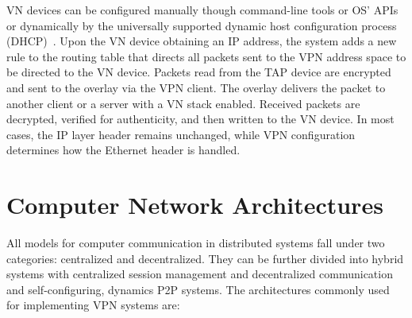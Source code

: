 VN devices can be configured manually though command-line tools or OS' APIs or
dynamically by the universally supported dynamic host configuration process
(DHCP)~\cite{dhcp0, dhcp1}.  Upon the VN device obtaining an IP address, the
system adds a new rule to the routing table that directs all packets sent to
the VPN address space to be directed to the VN device.  Packets read from the
TAP device are encrypted and sent to the overlay via the VPN client.  The
overlay delivers the packet to another client or a server with a VN stack
enabled.  Received packets are decrypted, verified for authenticity, and then
written to the VN device.  In most cases, the IP layer header remains unchanged,
while VPN configuration determines how the Ethernet header is handled.

\section{Computer Network Architectures}
All models for computer communication in distributed systems fall under two
categories:  centralized and decentralized.  They can be further divided into
hybrid systems with centralized session management and decentralized
communication and self-configuring, dynamics P2P systems.  The architectures
commonly used for implementing VPN systems are:

